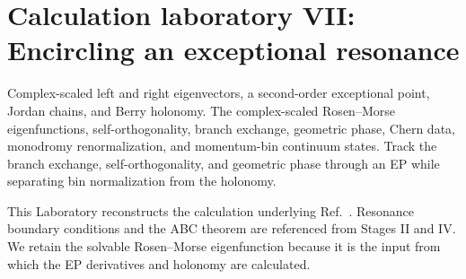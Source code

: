 \section{Calculation laboratory VII: Encircling an exceptional resonance}
\label{lab:2512_24528}

\calculationroute
  {Complex-scaled left and right eigenvectors, a second-order exceptional point, Jordan chains, and Berry holonomy.}
  {The complex-scaled Rosen--Morse eigenfunctions, self-orthogonality, branch exchange, geometric phase, Chern data, monodromy renormalization, and momentum-bin continuum states.}
  {Track the branch exchange, self-orthogonality, and geometric phase through an EP while separating bin normalization from the holonomy.}

This Laboratory reconstructs the calculation underlying
Ref.~\cite{Morikawa:2025inx}.  Resonance boundary conditions and the ABC
theorem are referenced from Stages II and IV.  We retain the solvable
Rosen--Morse eigenfunction because it is the input from which the EP
derivatives and holonomy are calculated.


